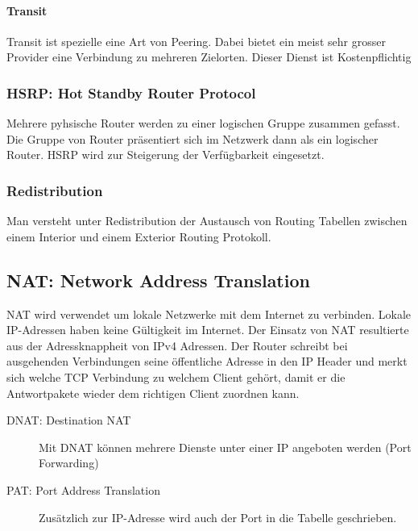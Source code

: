 \paragraph{Transit}
Transit ist spezielle eine Art von Peering. Dabei bietet ein meist sehr grosser Provider eine Verbindung zu mehreren Zielorten. Dieser Dienst ist Kostenpflichtig

\subsubsection{HSRP: Hot Standby Router Protocol}
Mehrere pyhsische Router werden zu einer logischen Gruppe zusammen gefasst. Die Gruppe von Router präsentiert sich im Netzwerk dann als ein logischer Router. HSRP wird zur Steigerung der Verfügbarkeit eingesetzt.

\subsubsection{Redistribution}
Man versteht unter Redistribution der Austausch von Routing Tabellen zwischen einem Interior und einem Exterior Routing Protokoll. 	

\subsection{NAT: Network Address Translation}
NAT wird verwendet um lokale Netzwerke mit dem Internet zu verbinden. Lokale IP-Adressen haben keine Gültigkeit im Internet. Der Einsatz von NAT resultierte aus der Adressknappheit von IPv4 Adressen. Der Router schreibt bei ausgehenden Verbindungen seine öffentliche Adresse in den IP Header und merkt sich welche TCP Verbindung zu welchem Client gehört, damit er die Antwortpakete wieder dem richtigen Client zuordnen kann.

\begin{description}
	\item[DNAT: Destination NAT] Mit DNAT können mehrere Dienste unter einer IP angeboten werden (Port Forwarding)
	\item [PAT: Port Address Translation] Zusätzlich zur IP-Adresse wird auch der Port in die Tabelle geschrieben.
\end{description}

